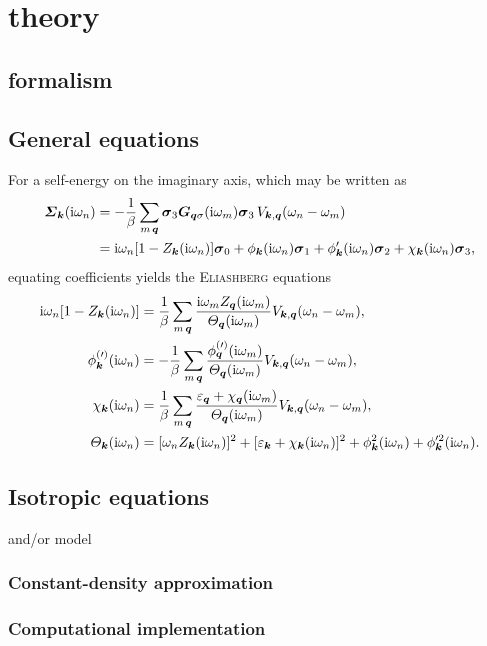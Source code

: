 
\chapter{ theory}

\section{ formalism}

\section{General equations}

For a self-energy on the imaginary axis, which may be written as
%
\begin{align*}
    \boldsymbol {\varSigma}_{\boldsymbol k}(\mathrm i \omega_n) &= -\frac 1 \beta \sum_{m \, \boldsymbol q}
    \boldsymbol \sigma_3 \boldsymbol G_{\boldsymbol q \sigma}(\mathrm i \omega_m) \boldsymbol \sigma_3 \,
    V_{\boldsymbol k, \boldsymbol q}(\omega_n - \omega_m)
    \\
    &= \mathrm i \omega_n [1 - Z_{\boldsymbol k}(\mathrm i \omega_n)] \boldsymbol \sigma_0
    + \phi_{\boldsymbol k}(\mathrm i \omega_n) \boldsymbol \sigma_1
    + \phi'_{\boldsymbol k}(\mathrm i \omega_n) \boldsymbol \sigma_2
    + \chi_{\boldsymbol k}(\mathrm i \omega_n) \boldsymbol \sigma_3,
\end{align*}
%
equating coefficients yields the \textsc{Eliashberg} equations
%
\begin{align} \label{Eliashberg equations}
    \begin{split}
        \mathrm i \omega_n [1 - Z_{\boldsymbol k}(\mathrm i \omega_n)] &=
        \frac 1 \beta \sum_{m \, \boldsymbol q}
        \frac
            {\mathrm i \omega_m Z_{\boldsymbol q}(\mathrm i \omega_m)}
            {\varTheta_{\boldsymbol q}(\mathrm i \omega_m)}
        V_{\boldsymbol k, \boldsymbol q}(\omega_n - \omega_m),
        \\
        \phi^{(\prime)}_{\boldsymbol k}(\mathrm i \omega_n) &=
        -\frac 1 \beta \sum_{m \, \boldsymbol q}
        \frac
            {\phi^{(\prime)}_{\boldsymbol q}(\mathrm i \omega_m)}
            {\varTheta_{\boldsymbol q}(\mathrm i \omega_m)}
        V_{\boldsymbol k, \boldsymbol q}(\omega_n - \omega_m),
        \\
        \chi_{\boldsymbol k}(\mathrm i \omega_n) &=
        \frac 1 \beta \sum_{m \, \boldsymbol q}
        \frac
            {\varepsilon_{\boldsymbol q} + \chi_{\boldsymbol q}(\mathrm i \omega_m)}
            {\varTheta_{\boldsymbol q}(\mathrm i \omega_m)}
        V_{\boldsymbol k, \boldsymbol q}(\omega_n - \omega_m),
        \\
        \varTheta_{\boldsymbol k}(\mathrm i \omega_n) &=
        [\omega_n Z_{\boldsymbol k}(\mathrm i \omega_n)]^2
        + [\varepsilon_{\boldsymbol k} + \chi_{\boldsymbol k}(\mathrm i \omega_n)]^2
        + \phi_{\boldsymbol k}^2(\mathrm i \omega_n)
        + \phi'^2_{\boldsymbol k}(\mathrm i \omega_n).
    \end{split}
\end{align}

\section{Isotropic equations}

 and/or  model

\subsection{Constant-density approximation}

\subsection{Computational implementation}
